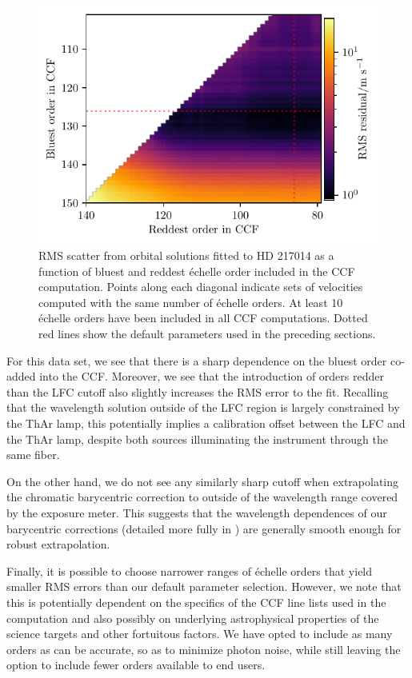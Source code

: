 \begin{figure}
\centering
\includegraphics{figures-4/vel_orders_217014.pdf}
\caption[Cross-correlation order range optimization]{RMS scatter from orbital solutions fitted to HD 217014 as a function of bluest and reddest \'echelle order included in the CCF computation. Points along each diagonal indicate sets of velocities computed with the same number of \'echelle orders. At least 10 \'echelle orders have been included in all CCF computations. Dotted red lines show the default parameters used in the preceding sections.\label{fig:orders}}
\end{figure}

For this data set, we see that there is a sharp dependence on the bluest order co-added into the CCF. Moreover, we see that the introduction of orders redder than the LFC cutoff also slightly increases the RMS error to the fit. Recalling that the wavelength solution outside of the LFC region is largely constrained by the ThAr lamp, this potentially implies a calibration offset between the LFC and the ThAr lamp, despite both sources illuminating the instrument through the same fiber.

On the other hand, we do not see any similarly sharp cutoff when extrapolating the chromatic barycentric correction to outside of the wavelength range covered by the exposure meter. This suggests that the wavelength dependences of our barycentric corrections (detailed more fully in \citealt{blackman_measured_2019}) are generally smooth enough for robust extrapolation.

Finally, it is possible to choose narrower ranges of \'echelle orders that yield smaller RMS errors than our default parameter selection. However, we note that this is potentially dependent on the specifics of the CCF line lists used in the computation and also possibly on underlying astrophysical properties of the science targets and other fortuitous factors. We have opted to include as many orders as can be accurate, so as to minimize photon noise, while still leaving the option to include fewer orders available to end users.


